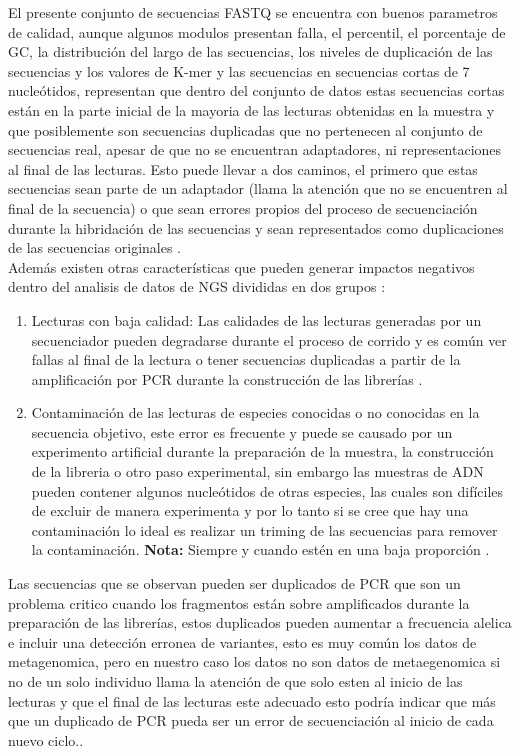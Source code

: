 El presente conjunto de secuencias FASTQ se encuentra con buenos parametros de calidad, aunque algunos modulos presentan falla, el percentil, el porcentaje de GC, la distribución del largo de las secuencias, los niveles de duplicación de las secuencias y los valores de K-mer y las secuencias en secuencias cortas de 7 nucleótidos, representan que dentro del conjunto de datos estas secuencias cortas están en la parte inicial de la mayoria de las lecturas obtenidas en la muestra y que posiblemente son secuencias duplicadas que no pertenecen al conjunto de secuencias real, apesar de que no se encuentran adaptadores, ni representaciones al final de las lecturas. Esto puede llevar a dos caminos, el primero que estas secuencias sean parte de un adaptador (llama la atención que no se encuentren al final de la secuencia)  o que sean errores propios del proceso de secuenciación durante la hibridación de las secuencias y sean representados como duplicaciones de las secuencias originales \cite{Babraham2016}\cite{Pirooznia2014}. \\ 

Además existen otras características que pueden generar impactos negativos dentro del analisis de datos de NGS divididas en dos grupos \cite{Zhou2013}: 

\begin{enumerate}
	\item Lecturas con baja calidad: Las calidades de las lecturas generadas por un secuenciador pueden degradarse durante el proceso de corrido y es común ver fallas al final de la lectura o tener secuencias duplicadas a partir de la amplificación por PCR durante la construcción de las librerías \cite{Zhou2013}.
	\item Contaminación de las lecturas de especies conocidas o no conocidas en la secuencia objetivo, este error es frecuente y puede se causado por un experimento artificial durante la preparación de la muestra, la construcción de la libreria o otro paso experimental, sin embargo las muestras de ADN pueden contener algunos nucleótidos de otras especies, las cuales son difíciles de excluir de manera experimenta y por lo tanto si se cree que hay una contaminación lo ideal es realizar un triming de las secuencias para remover la contaminación. \textbf{Nota:} Siempre y cuando estén en una baja proporción \cite{Zhou2013}.
\end{enumerate}

Las secuencias que se  observan pueden ser duplicados de PCR que son un problema critico cuando los fragmentos están sobre amplificados durante la preparación de las librerías, estos duplicados pueden aumentar a frecuencia alelica e incluir una detección erronea de variantes, esto es muy común los datos de metagenomica, pero en nuestro caso los datos no son datos de metaegenomica si no de un solo individuo llama la atención de que solo esten al inicio de las lecturas y que el final de las lecturas este adecuado esto podría indicar que más que un duplicado de PCR pueda ser un error de secuenciación al inicio de cada nuevo ciclo.\cite{Pandey2016}. \\

